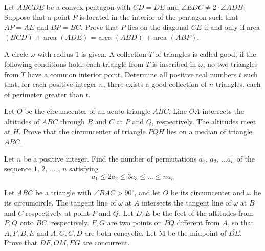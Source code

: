 \documentclass[11pt]{scrartcl}
\begin{document}
\begin{problem}[1336030836839904136]
Let $ABCDE$ be a convex pentagon with $CD= DE$ and $\angle EDC \ne 2 \cdot \angle ADB$.
Suppose that a point $P$ is located in the interior of the pentagon such that $AP =AE$ and $BP= BC$.
Prove that $P$ lies on the diagonal $CE$ if and only if area $(BCD)$ + area $(ADE)$ = area $(ABD)$ + area $(ABP)$.
\end{problem}
\begin{problem}[2265193939454652363]
	A circle $\omega$ with radius $1$ is given. A collection $T$ of triangles is called good, if the following conditions hold:
each triangle from $T$ is inscribed in $\omega$;
no two triangles from $T$ have a common interior point.
Determine all positive real numbers $t$ such that, for each positive integer $n$, there exists a good collection of $n$ triangles, each of perimeter greater than $t$.
\end{problem}
\begin{problem}[2139114147569608698]
Let $O$ be the circumcenter of an acute triangle $ABC$. Line $OA$ intersects the altitudes of $ABC$ through $B$ and $C$ at $P$ and $Q$, respectively. The altitudes meet at $H$. Prove that the circumcenter of triangle $PQH$ lies on a median of triangle $ABC$.
\end{problem}
\begin{problem}[233559801569582]
Let $n$ be a positive integer. Find the number of permutations $a_1$, $a_2$, $\dots a_n$ of the
sequence $1$, $2$, $\dots$ , $n$ satisfying
$$a_1 \le 2a_2\le 3a_3 \le \dots \le na_n$$
\end{problem}
\begin{problem}[571373387028298]
Let $ABC$ be a triangle with $\angle BAC > 90 ^{\circ}$, and let $O$ be its circumcenter and $\omega$ be its circumcircle. The tangent line of $\omega$ at $A$ intersects the tangent line of $\omega$ at $B$ and $C$ respectively at point $P$ and $Q$. Let $D,E$ be the feet of the altitudes from $P,Q$ onto $BC$, respectively. $F,G$ are two points on $\overline{PQ}$ different from $A$, so that $A,F,B,E$ and $A,G,C,D$ are both concyclic. Let M be the midpoint of $\overline{DE}$. Prove that $DF,OM,EG$ are concurrent.
\end{problem}
\end{document}
